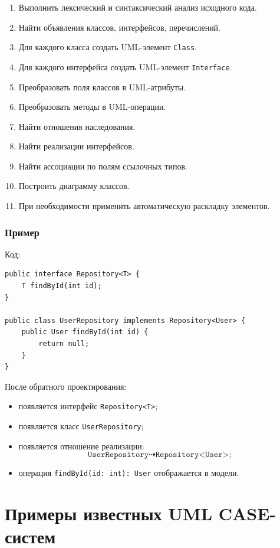 \documentclass[12pt,a4paper]{article}
\begin{document}
\begin{enumerate}
    \item Выполнить лексический и синтаксический анализ исходного кода.
    \item Найти объявления классов, интерфейсов, перечислений.
    \item Для каждого класса создать UML-элемент \texttt{Class}.
    \item Для каждого интерфейса создать UML-элемент \texttt{Interface}.
    \item Преобразовать поля классов в UML-атрибуты.
    \item Преобразовать методы в UML-операции.
    \item Найти отношения наследования.
    \item Найти реализации интерфейсов.
    \item Найти ассоциации по полям ссылочных типов.
    \item Построить диаграмму классов.
    \item При необходимости применить автоматическую раскладку элементов.
\end{enumerate}

\subsubsection*{Пример}

Код:

\begin{verbatim}
public interface Repository<T> {
    T findById(int id);
}

public class UserRepository implements Repository<User> {
    public User findById(int id) {
        return null;
    }
}
\end{verbatim}

После обратного проектирования:
\begin{itemize}
    \item появляется интерфейс \texttt{Repository<T>};
    \item появляется класс \texttt{UserRepository};
    \item появляется отношение реализации:
    \[
    \texttt{UserRepository} \dashrightarrow \texttt{Repository<User>};
    \]
    \item операция \texttt{findById(id: int): User} отображается в модели.
\end{itemize}

\section{Примеры известных UML CASE-систем}
\end{document}
